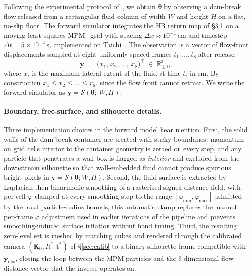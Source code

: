 Following the experimental protocol
of~\cite{hamamichi2023nonnewtonian}, we obtain $\boldsymbol{\theta}$
by observing a dam-break flow released from a rectangular fluid column
of width $W$ and height $H$ on a flat, no-slip floor. The forward
simulator integrates the HB return map of \S3.1 on a
moving-least-squares MPM~\cite{hu2018moving} grid with spacing
$\Delta x \approx 10^{-1}$\,cm and timestep $\Delta t = 5\times
10^{-4}$\,s, implemented on Taichi~\cite{hu2019taichi}. The
observation is a vector of flow-front displacements sampled at eight
uniformly spaced frames $t_1,\dots,t_8$ after release:
\begin{equation}
\label{eq:y-def}
    \mathbf{y}
    \;=\;
    \bigl(x_1,\,x_2,\,\dots,\,x_8\bigr)^{\!\top}
    \;\in\;
    \mathbb{R}_{\ge 0}^{8},
\end{equation}
where $x_i$ is the maximum lateral extent of the fluid at time $t_i$
in cm. By construction $x_1 \le x_2 \le \dots \le x_8$, since the
flow front cannot retract. We write the forward simulator as
$\mathbf{y} = \mathcal{S}(\boldsymbol{\theta};\,W, H)$.

\paragraph{Boundary, free-surface, and silhouette details.}
Three implementation choices in the forward model bear mention.
First, the solid walls of the dam-break container are treated with
sticky boundaries: momentum on grid cells interior to the container
geometry is zeroed on every step, and any particle that penetrates a
wall box is flagged as \emph{interior} and excluded from the
downstream silhouette so that wall-embedded fluid cannot produce
spurious bright pixels in
$\mathbf{y} = \mathcal{S}(\boldsymbol{\theta}; W, H)$. Second, the
fluid surface is extracted by Laplacian-then-biharmonic smoothing of
a rasterised signed-distance field, with per-cell $\varphi$ clamped at
every smoothing step to the range
$[\varphi_{\min}, \varphi_{\max}]$ admitted by the local particle-radius
bounds; this automatic clamp replaces the manual per-frame $\varphi$
adjustment used in earlier iterations of the pipeline and prevents
smoothing-induced surface inflation without hand tuning. Third, the
resulting zero-level set is meshed by marching cubes and rendered
through the calibrated camera $(\mathbf{K}_{0}, R^{*}, \mathbf{t}^{*})$ of
\S\ref{sec:calib} to a binary silhouette frame-compatible with
$\mathbf{y}_{\mathrm{obs}}$, closing the loop between the MPM
particles and the $8$-dimensional flow-distance vector that the
inverse operates on.


